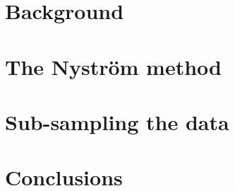 \section{Background}
\label{sec:ch05_background}

\section{The Nystr\"om method}
\label{sec:the_nystrom_method}

\section{Sub-sampling the data}
\label{sec:sub_sampling_the_data}


\section{Conclusions}
\label{Conslusions}
